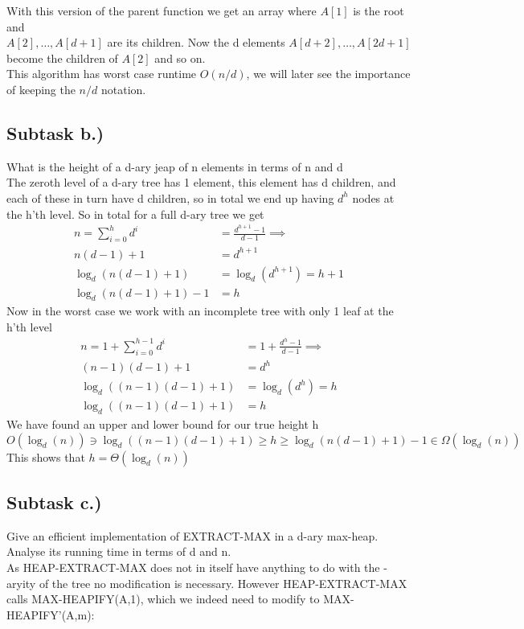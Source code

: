 \documentclass{article}
\theoremstyle{remark}
\numberwithin{equation}{section}
\begin{document}
With this version of the parent function we get an array where $A[1]$ is the root and\\ $A[2],\dots,A[d+1]$ are its children. Now the d elements $A[d+2],\dots,A[2d+1]$ become the children of $A[2]$ and so on.\\
This algorithm has worst case runtime $O(n/d)$, we will later see the importance of keeping the $n/d$ notation.
\newpage \subsection{Subtask b.)} What is the height of a d-ary jeap of n elements in terms of n and d
\\The zeroth level of a d-ary tree has 1 element, this element has d children, and each of these in turn have d children, so in total we end up having $d^h$ nodes at the h'th level. So in total for a full d-ary tree we get
\begin{align*}
	n = \sum_{i=0}^{h} d^i &= \frac{d^{h+1}-1}{d-1} \implies\\
	n(d-1)+1 &= d^{h+1}\\
	\log_d(n(d-1)+1) &= \log_d(d^{h+1}) = h+1\\
	\log_d(n(d-1)+1)-1 &= h
\end{align*}
Now in the worst case we work with an incomplete tree with only 1 leaf at the h'th level 
\begin{align*}
n =1+ \sum_{i=0}^{h-1} d^i &= 1+\frac{d^{h}-1}{d-1} \implies\\
(n-1)(d-1)+1 &= d^{h}\\
\log_d((n-1)(d-1)+1) &= \log_d(d^{h}) = h\\
\log_d((n-1)(d-1)+1) &= h
\end{align*}
We have found an upper and lower bound for our true height h
\begin{equation}
	O(\log_d(n))\ni\log_d((n-1)(d-1)+1) \geq h \geq \log_d(n(d-1)+1)-1\in\Omega(\log_d(n))
\end{equation}
This shows that $h = \Theta(\log_d(n))$
\newpage\subsection{Subtask c.)} Give an efficient implementation of EXTRACT-MAX in a d-ary max-heap. Analyse its running time in terms of d and n.
\\As HEAP-EXTRACT-MAX does not in itself have anything to do with the -aryity of the tree no modification is necessary. However HEAP-EXTRACT-MAX calls MAX-HEAPIFY(A,1), which we indeed need to modify to MAX-HEAPIFY'(A,m):
\end{document}
